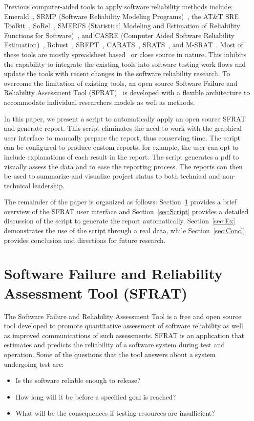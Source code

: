 \documentclass[conference]{IEEEtran}
\begin{document}
Previous computer-aided tools to apply software reliability methods include: Emerald~\cite{1996hudepohlemerald}, SRMP (Software Reliability Modeling Programs)~\cite{1988SRMP}, the AT\&T SRE Toolkit~\cite{1990ATT}, SoRel~\cite{1993kanounsorel}, SMERFS (Statistical Modeling and Estimation of Reliability Functions for Software)~\cite{trSMERFS}, and CASRE (Computer Aided Software Reliability Estimation)~\cite{lyu1992casre}, Robust~\cite{1995lirobust}, SREPT~\cite{2000ramanisrept}, CARATS~\cite{2011huangestimation}, SRATS~\cite{inProcISSRE2013_100}, and M-SRAT~\cite{2015shibatam}. Most of these tools are mostly spreadsheet based~\cite{inProcISSRE2013_100} or close source in nature. This inhibits the capability to integrate the existing tools into software testing work flows and update the tools with recent changes in the software reliability research. To overcome the limitation of existing tools, an open source Software Failure and Reliability Assessment Tool (SFRAT)~\cite{cFio53} is developed with a flexible architecture to accommodate individual researchers models as well as methods.

In this paper, we present a script to automatically apply an open source SFRAT and generate report. This script eliminates the need to work with the graphical user interface to manually prepare the report, thus conserving time. The script can be configured to produce custom reports; for example, the user can opt to include explanations of each result in the report. The script generates a pdf to visually assess the data and to ease the reporting process. The reports can then be used to summarize and visualize project status to both technical and non-technical leadership.

The remainder of the paper is organized as follows: Section~\ref{sec:SFRAT} provides a brief overview of the SFRAT user interface and Section~\ref{sec:Script} provides a detailed discussion of the script to generate the report automatically. Section~\ref{sec:Ex} demonstrates the use of the script through a real data, while Section~\ref{sec:Concl} provides conclusion and directions for future research.


\section{Software Failure and Reliability Assessment Tool (SFRAT)}\label{sec:SFRAT}
The Software Failure and Reliability Assessment Tool is a free and open source tool developed to promote quantitative assessment of software reliability as well as improved communications of such assessments. SFRAT is an application that estimates and predicts the reliability of a software system during test and operation. Some of the questions that the tool answers about a system undergoing test are:
\begin{itemize}
\item {Is the software reliable enough to release?}
\item {How long will it be before a specified goal is reached?}
\item {What will be the consequences if testing resources are insufficient?}
\end{itemize}
\end{document}
